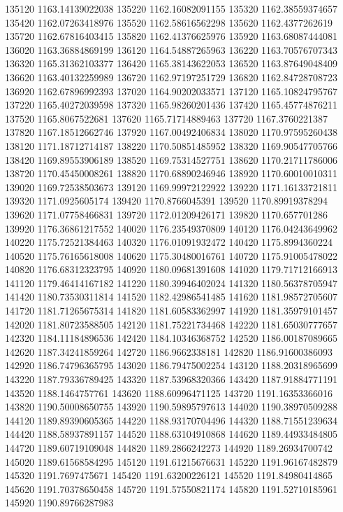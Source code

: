{135120 1163.14139022038
135220 1162.16082091155
135320 1162.38559374657
135420 1162.07263418976
135520 1162.58616562298
135620 1162.4377262619
135720 1162.67816403415
135820 1162.41376625976
135920 1163.68087444081
136020 1163.36884869199
136120 1164.54887265963
136220 1163.70576707343
136320 1165.31362103377
136420 1165.38143622053
136520 1163.87649048409
136620 1163.40132259989
136720 1162.97197251729
136820 1162.84728708723
136920 1162.67896992393
137020 1164.90202033571
137120 1165.10824795767
137220 1165.40272039598
137320 1165.98260201436
137420 1165.45774876211
137520 1165.8067522681
137620 1165.71714889463
137720 1167.3760221387
137820 1167.18512662746
137920 1167.00492406834
138020 1170.97595260438
138120 1171.18712714187
138220 1170.50851485952
138320 1169.90547705766
138420 1169.89553906189
138520 1169.75314527751
138620 1170.21711786006
138720 1170.45450008261
138820 1170.68890246946
138920 1170.60010010311
139020 1169.72538503673
139120 1169.99972122922
139220 1171.16133721811
139320 1171.0925605174
139420 1170.8766045391
139520 1170.89919378294
139620 1171.07758466831
139720 1172.01209426171
139820 1170.657701286
139920 1176.36861217552
140020 1176.23549370809
140120 1176.04243649962
140220 1175.72521384463
140320 1176.01091932472
140420 1175.8994360224
140520 1175.76165618008
140620 1175.30480016761
140720 1175.91005478022
140820 1176.68312323795
140920 1180.09681391608
141020 1179.71712166913
141120 1179.46414167182
141220 1180.39946402024
141320 1180.56378705947
141420 1180.73530311814
141520 1182.42986541485
141620 1181.98572705607
141720 1181.71265675314
141820 1181.60583362997
141920 1181.35979101457
142020 1181.80723588505
142120 1181.75221734468
142220 1181.65030777657
142320 1184.11184896536
142420 1184.10346368752
142520 1186.00187089665
142620 1187.34241859264
142720 1186.9662338181
142820 1186.91600386093
142920 1186.74796365795
143020 1186.79475002254
143120 1188.20318965699
143220 1187.79336789425
143320 1187.53968320366
143420 1187.91884771191
143520 1188.1464757761
143620 1188.60996471125
143720 1191.16353366016
143820 1190.50008650755
143920 1190.59895797613
144020 1190.38970509288
144120 1189.89390605365
144220 1188.93170704496
144320 1188.71551239634
144420 1188.58937891157
144520 1188.63104910868
144620 1189.44933484805
144720 1189.60719109048
144820 1189.2866242273
144920 1189.26934700742
145020 1189.61568584295
145120 1191.61215676631
145220 1191.96167482879
145320 1191.7697475671
145420 1191.63200226121
145520 1191.84980414865
145620 1191.70378650458
145720 1191.57550821174
145820 1191.52710185961
145920 1190.89766287983
}
